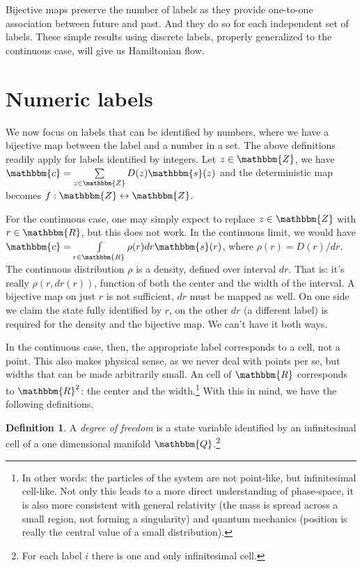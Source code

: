 \documentclass[aps,pra,10pt,twocolumn,floatfix,nofootinbib]{revtex4-1}
\theoremstyle{definition}
\newtheorem{defn}[thm]{Definition}
\begin{document}
Bijective maps preserve the number of labels as they provide one-to-one association between future and past. And they do so for each independent set of labels. These simple results using discrete labels, properly generalized to the continuous case, will give us Hamiltonian flow.

\section{Numeric labels}

We now focus on labels that can be identified by numbers, where we have a bijective map between the label and a number in a set. The above definitions readily apply for labels identified by integers. Let $z \in \mathbbm{Z}$, we have $\mathbbm{c}=\sum\limits_{z \in \mathbbm{Z}} D(z) \mathbbm{s}(z)$ and the deterministic map becomes $f:\mathbbm{Z} \leftrightarrow \mathbbm{Z}$.

For the continuous case, one may simply expect to replace $z \in \mathbbm{Z}$ with $r \in \mathbbm{R}$, but this does not work. In the continuous limit, we would have $\mathbbm{c}=\int\limits_{r \in \mathbbm{R}} \rho(r) dr \mathbbm{s}(r)$, where $\rho(r) = D(r) / dr$. The continuous distribution $\rho$ is a density, defined over interval $dr$. That is: it's really $\rho(r, dr(r))$, function of both the center and the width of the interval. A bijective map on just $r$ is not sufficient, $dr$ must be mapped as well. On one side we claim the state fully identified by $r$, on the other $dr$ (a different label) is required for the density and the bijective map. We can't have it both ways.
 
In the continuous case, then, the appropriate label corresponds to a cell, not a point. This also makes physical sense, as we never deal with points per se, but widths that can be made arbitrarily small. An cell of $\mathbbm{R}$ corresponds to $\mathbbm{R}^2$: the center and the width.\footnote{In other words: the particles of the system are not point-like, but infinitesimal cell-like. Not only this leads to a more direct understanding of phase-space, it is also more consistent with general relativity (the mass is spread across a small region, not forming a singularity) and quantum mechanics (position is really the central value of a small distribution).} With this in mind, we have the following definitions.

\begin{defn}\label{sdof}
A \emph{degree of freedom} is a state variable identified by an infinitesimal cell of a one dimensional manifold $\mathbbm{Q}$.\footnote{For each label $i$ there is one and only infinitesimal cell.}
\end{defn}
\end{document}
